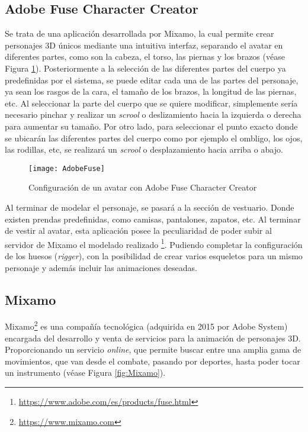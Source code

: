\subsection{Adobe Fuse Character Creator}

Se trata de una aplicación desarrollada por Mixamo, la cual permite crear personajes 3D únicos mediante una intuitiva interfaz, separando el avatar en diferentes partes, como son la cabeza, el torso, las piernas y los brazos (véase Figura \ref{fig:AdobeFuse}). Posteriormente a la selección de las diferentes partes del cuerpo ya predefinidas por el sistema, se puede editar cada una de las partes del personaje, ya sean los rasgos de la cara, el tamaño de los brazos, la longitud de las piernas, etc. Al seleccionar la parte del cuerpo que se quiere modificar, simplemente sería necesario pinchar y realizar un \textit{scrool} o deslizamiento hacia la izquierda o derecha para aumentar su tamaño. Por otro lado, para seleccionar el punto exacto donde se ubicarán las diferentes partes del cuerpo como por ejemplo el ombligo, los ojos, las rodillas, etc, se realizará un \textit{scrool} o desplazamiento hacia arriba o abajo.

\begin{figure}[h!]
	\centering
	\texttt{[image: AdobeFuse]}
	\caption{Configuración de un avatar con Adobe Fuse Character Creator}
	\label{fig:AdobeFuse}
\end{figure}

Al terminar de modelar el personaje, se pasará a la sección de vestuario. Donde existen prendas predefinidas, como camisas, pantalones, zapatos, etc. Al terminar de vestir al avatar, esta aplicación posee la peculiaridad de poder subir al servidor de Mixamo el modelado realizado \footnote{\url{https://www.adobe.com/es/products/fuse.html}}. Pudiendo completar la configuración de los huesos (\textit{rigger}), con la posibilidad de crear varios esqueletos para un mismo personaje y además incluir las animaciones deseadas.



\subsection{Mixamo}

Mixamo\footnote{\url{https://www.mixamo.com}} es una compañía tecnológica (adquirida en 2015 por Adobe System) encargada del desarrollo y venta de servicios para la animación de personajes 3D. Proporcionando un servicio \textit{online}, que permite buscar entre una amplia gama de movimientos, que van desde el combate, pasando por deportes, hasta poder tocar un instrumento (véase Figura \ref{fig:Mixamo}).

